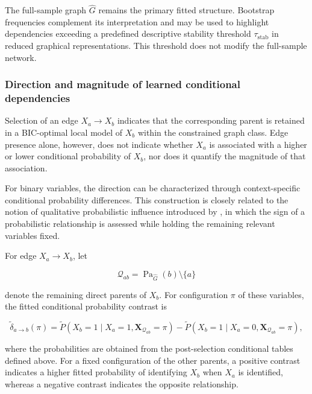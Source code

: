 The full-sample graph \(\widehat G\) remains the primary fitted structure.
Bootstrap frequencies complement its interpretation and may be used to
highlight dependencies exceeding a predefined descriptive stability threshold
\(\tau_{\mathrm{stab}}\) in reduced graphical representations. This threshold
does not modify the full-sample network.


\subsubsection{Direction and magnitude of learned conditional dependencies}
\label{sec:chap4_global_bn_contrast}

Selection of an edge \(X_a\rightarrow X_b\) indicates that the corresponding
parent is retained in a BIC-optimal local model of \(X_b\) within the
constrained graph class. Edge presence alone, however, does not indicate
whether \(X_a\) is associated with a higher or lower conditional probability
of \(X_b\), nor does it quantify the magnitude of that association.

For binary variables, the direction can be characterized through
context-specific conditional probability differences. This construction is
closely related to the notion of qualitative probabilistic influence
introduced by \citet{wellman1990fundamental}, in which the sign of a
probabilistic relationship is assessed while holding the remaining relevant
variables fixed.

For edge \(X_a\rightarrow X_b\), let

\[
\mathcal Q_{ab}
=
\operatorname{Pa}_{\widehat G}(b)
\setminus\{a\}
\]

denote the remaining direct parents of \(X_b\). For configuration \(\pi\) of
these variables, the fitted conditional probability contrast is

\[
\widetilde{\delta}_{a\rightarrow b}(\pi)
=
\widetilde P
\left(
X_b=1
\mid
X_a=1,
\mathbf X_{\mathcal Q_{ab}}=\pi
\right)
-
\widetilde P
\left(
X_b=1
\mid
X_a=0,
\mathbf X_{\mathcal Q_{ab}}=\pi
\right),
\]

where the probabilities are obtained from the post-selection conditional
tables defined above. For a fixed configuration of the other parents, a
positive contrast indicates a higher fitted probability of identifying
\(X_b\) when \(X_a\) is identified, whereas a negative contrast indicates the
opposite relationship.

